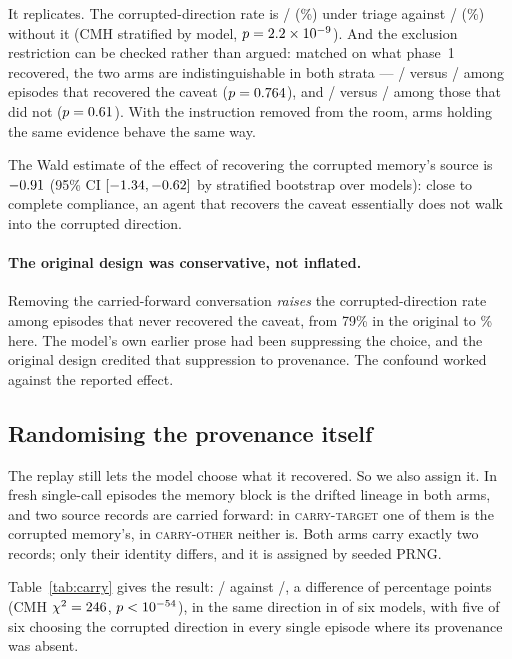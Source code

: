 It replicates. The corrupted-direction rate is \ThreeATrK/\ThreeATrN{}
(\ThreeATrPct\%) under triage against \ThreeADrK/\ThreeADrN{} (\ThreeADrPct\%)
without it (CMH stratified by model, $p = 2.2\times 10^{-9}$). And the exclusion
restriction can be checked rather than argued: matched on what phase~1
recovered, the two arms are indistinguishable in both strata ---
\ThreeARecDrK/\ThreeARecDrN{} versus \ThreeARecTrK/\ThreeARecTrN{} among
episodes that recovered the caveat ($p = 0.764$), and
\ThreeAUnrecDrK/\ThreeAUnrecDrN{} versus \ThreeAUnrecTrK/\ThreeAUnrecTrN{} among
those that did not ($p = 0.61$). With the instruction removed from
the room, arms holding the same evidence behave the same way.

The Wald estimate of the effect of recovering the corrupted memory's source is
$-0.91$ (95\% CI $[-1.34, -0.62]$ by stratified bootstrap over models): close
to complete compliance, an agent that recovers the caveat essentially does not
walk into the corrupted direction.

\paragraph{The original design was conservative, not inflated.} Removing the
carried-forward conversation \emph{raises} the corrupted-direction rate among
episodes that never recovered the caveat, from 79\% in the original to
\ThreeAUnrecDrPctText\% here. The model's own earlier prose had been suppressing
the choice, and the original design credited that suppression to provenance. The
confound worked against the reported effect.

\subsection{Randomising the provenance itself}

The replay still lets the model choose what it recovered. So we also assign it.
In \ThreeBN{} fresh single-call episodes the memory block is the drifted lineage
in both arms, and two source records are carried forward: in \textsc{carry-target}
one of them is the corrupted memory's, in \textsc{carry-other} neither is. Both
arms carry exactly two records; only their identity differs, and it is assigned
by seeded PRNG.



Table~\ref{tab:carry} gives the result: \ThreeBTgtK/\ThreeBTgtN{} against
\ThreeBOthK/\ThreeBOthN{}, a difference of \ThreeBDiff{} percentage points
(CMH $\chi^2 = 246$, $p <10^{-54}$), in the same direction in
\ThreeBAllModels{} of six models, with five of six choosing the corrupted
direction in every single episode where its provenance was absent.

